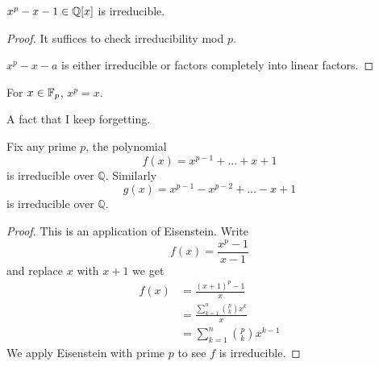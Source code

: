 \begin{prop}
    $x^p-x-1\in\mathbb{Q}[x]$ is irreducible. 
\end{prop}
\begin{proof}
    It suffices to check irreducibility mod $p$. 

    $x^p-x-a$ is either irreducible or factors completely into linear factors. 
\end{proof}



\begin{prop}
    For $x\in\mathbb{F}_p$, $x^p=x$.
\end{prop}
A fact that I keep forgetting.



\begin{prop}
    Fix any prime $p$, the polynomial 
    \begin{equation*}
        f(x)=x^{p-1}+\dots+x+1
    \end{equation*}
    is irreducible over $\mathbb{Q}$. Similarly 
    \begin{equation*}
        g(x)=x^{p-1}-x^{p-2}+\dots-x+1
    \end{equation*}
    is irreducible over $\mathbb{Q}$.
\end{prop}
\begin{proof}
    This is an application of Eisenstein. Write 
    \begin{equation*}
        f(x)=\frac{x^p-1}{x-1}
    \end{equation*}
    and replace $x$ with $x+1$ we get 
    \begin{align*}
        f(x)&=\frac{(x+1)^{p}-1}{x}\\
        &=\frac{\sum_{k=1}^n\binom{p}{k}x^k}{x}\\
        &=\sum_{k=1}^n\binom{p}{k}x^{k-1}
    \end{align*}
    We apply Eisenstein with prime $p$ to see $f$ is irreducible.
\end{proof}

